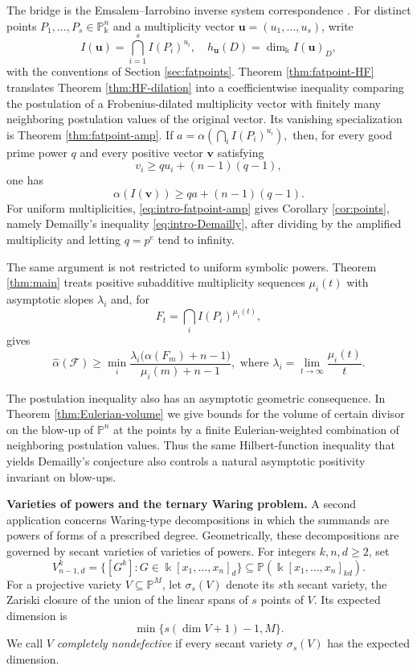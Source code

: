 \documentclass[11pt]{amsart}
\theoremstyle{remark}
\newcommand{\PP}{\mathbb P}
\newcommand{\kk}{\Bbbk}
\begin{document}
The bridge is the Emsalem--Iarrobino inverse system correspondence \cite[Theorem~I]{EI}. For distinct points $P_1,\ldots,P_s\in\PP^n_\kk$ and a multiplicity vector $\mathbf u=(u_1,\ldots,u_s)$, write
$$
I(\mathbf u)=\bigcap_{i=1}^s I(P_i)^{u_i},
\quad
h_{\mathbf u}(D)=\dim_\kk I(\mathbf u)_D,
$$
with the conventions of Section \ref{sec:fatpoints}. Theorem \ref{thm:fatpoint-HF} translates Theorem \ref{thm:HF-dilation} into a coefficientwise inequality comparing the postulation of a Frobenius-dilated multiplicity vector with finitely many neighboring postulation values of the original vector. Its vanishing specialization is Theorem \ref{thm:fatpoint-amp}. If
$
a=\alpha\left(\bigcap_i I(P_i)^{u_i}\right),
$
then, for every good prime power $q$ and every positive vector $\mathbf v$ satisfying
$$
v_i\ge qu_i+(n-1)(q-1),
$$
one has
\begin{equation}\label{eq:intro-fatpoint-amp}
\alpha(I(\mathbf v))\ge qa+(n-1)(q-1).
\end{equation}
For uniform multiplicities, \eqref{eq:intro-fatpoint-amp} gives Corollary \ref{cor:points}, namely Demailly's inequality \eqref{eq:intro-Demailly}, after dividing by the amplified multiplicity and letting $q=p^e$ tend to infinity.

The same argument is not restricted to uniform symbolic powers. Theorem \ref{thm:main} treats positive subadditive multiplicity sequences $\mu_i(t)$ with asymptotic slopes $\lambda_i$ and, for
$$
F_t=\bigcap_i I(P_i)^{\mu_i(t)},
$$
gives
$$
\widehat\alpha(\mathcal F)
\ge
\min_i
\frac{\lambda_i\bigl(\alpha(F_m)+n-1\bigr)}{\mu_i(m)+n-1}, \text{ where } \lambda_i = \lim_{t \rightarrow \infty} \frac{\mu_i(t)}{t}.
$$

The postulation inequality also has an asymptotic geometric consequence. In Theorem \ref{thm:Eulerian-volume} we give bounds for the volume of certain divisor on the blow-up of $\PP^n$ at the points by a finite Eulerian-weighted combination of neighboring postulation values. Thus the same Hilbert-function inequality that yields Demailly's conjecture also controls a natural asymptotic positivity invariant on blow-ups.

\medskip
\noindent\textbf{Varieties of powers and the ternary Waring problem.}
A second application concerns Waring-type decompositions in which the summands are powers of forms of a prescribed degree. Geometrically, these decompositions are governed by secant varieties of varieties of powers. For integers $k,n,d\ge2$, set
$$
V^k_{n-1,d}
=
\{[G^k]:G\in\kk[x_1,\ldots,x_n]_d\}
\subseteq
\PP(\kk[x_1,\ldots,x_n]_{kd}).
$$
For a projective variety $V\subseteq\PP^M$, let $\sigma_s(V)$ denote its $s$th secant variety, the Zariski closure of the union of the linear spans of $s$ points of $V$. Its expected dimension is
$$
\min\{s(\dim V+1)-1,M\}.
$$
We call $V$ \emph{completely nondefective} if every secant variety $\sigma_s(V)$ has the expected dimension.
\end{document}
